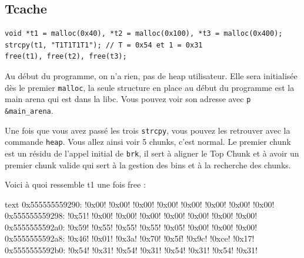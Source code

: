 \subsection{Tcache}
\begin{verbatim}
void *t1 = malloc(0x40), *t2 = malloc(0x100), *t3 = malloc(0x400);
strcpy(t1, "T1T1T1T1"); // T = 0x54 et 1 = 0x31
free(t1), free(t2), free(t3);
\end{verbatim}

Au début du programme, on n'a rien, pas de heap utilisateur.
Elle sera initialisée dès le premier \texttt{malloc}, la seule structure en place au début du programme est
la main arena qui est dans la libc. Vous pouvez voir son adresse avec \texttt{p \&main\_arena}.

Une fois que vous avez passé les trois \texttt{strcpy}, vous pouvez les retrouver avec la commande \texttt{heap}.
Vous allez ainsi voir 5 chunks, c'est normal.
Le premier chunk est un résidu de l'appel initial de \texttt{brk}, il sert à aligner le Top Chunk et à avoir
un premier chunk valide qui sert à la gestion des bins et à la recherche des chunks.

Voici à quoi ressemble t1 une fois free :

\begin{pwndbg}[x/40bx t1 - 0x10]{text}
    0x555555559290: !\textcolor{pwndbgbrown}{0x00}! !\textcolor{pwndbgbrown}{0x00}! !\textcolor{pwndbgbrown}{0x00}! !\textcolor{pwndbgbrown}{0x00}! !\textcolor{pwndbgbrown}{0x00}! !\textcolor{pwndbgbrown}{0x00}! !\textcolor{pwndbgbrown}{0x00}! !\textcolor{pwndbgbrown}{0x00}!
    0x555555559298: !\textcolor{pwndbgred}{0x51}! !\textcolor{pwndbgred}{0x00}! !\textcolor{pwndbgred}{0x00}! !\textcolor{pwndbgred}{0x00}! !\textcolor{pwndbgred}{0x00}! !\textcolor{pwndbgred}{0x00}! !\textcolor{pwndbgred}{0x00}! !\textcolor{pwndbgred}{0x00}!
    0x5555555592a0: !\textcolor{pwndbgblue}{0x59}! !\textcolor{pwndbgblue}{0x55}! !\textcolor{pwndbgblue}{0x55}! !\textcolor{pwndbgblue}{0x55}! !\textcolor{pwndbgblue}{0x05}! !\textcolor{pwndbgblue}{0x00}! !\textcolor{pwndbgblue}{0x00}! !\textcolor{pwndbgblue}{0x00}!
    0x5555555592a8: !\textcolor{pwndbgdarkgreen}{0x46}! !\textcolor{pwndbgdarkgreen}{0x01}! !\textcolor{pwndbgdarkgreen}{0x3a}! !\textcolor{pwndbgdarkgreen}{0x70}! !\textcolor{pwndbgdarkgreen}{0x5f}! !\textcolor{pwndbgdarkgreen}{0x9c}! !\textcolor{pwndbgdarkgreen}{0xce}! !\textcolor{pwndbgdarkgreen}{0x17}!
    0x5555555592b0: !\textcolor{pwndbgdarkgreen}{0x54}! !\textcolor{pwndbgdarkgreen}{0x31}! !\textcolor{pwndbgdarkgreen}{0x54}! !\textcolor{pwndbgdarkgreen}{0x31}! !\textcolor{pwndbgdarkgreen}{0x54}! !\textcolor{pwndbgdarkgreen}{0x31}! !\textcolor{pwndbgdarkgreen}{0x54}! !\textcolor{pwndbgdarkgreen}{0x31}!
\end{pwndbg}

